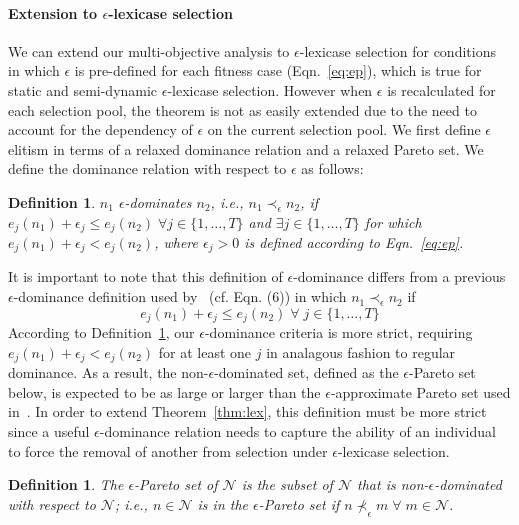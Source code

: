 \documentclass[twoside]{article}
\newtheorem{defn}[lex]{Definition}
\begin{document}
\paragraph{Extension to $\epsilon$-lexicase selection}
We can extend our multi-objective analysis to $\epsilon$-lexicase selection for conditions in which $\epsilon$ is pre-defined for each fitness case  (Eqn.~\ref{eq:ep}), which is true for static and semi-dynamic $\epsilon$-lexicase selection. However when $\epsilon$ is recalculated for each selection pool, the theorem is not as easily extended due to the need to account for the dependency of $\epsilon$ on the current selection pool. We first define $\epsilon$ elitism in terms of a relaxed dominance relation and a relaxed Pareto set. We define the dominance relation with respect to $\epsilon$ as follows:


\begin{defn}\label{def:edom}
$n_1$ {\it $\epsilon$-dominates} $n_2$, i.e., ${n_1} \prec_{\epsilon} {n_2}$, if $e_j(n_1) + \epsilon_j \leq e_j(n_2)  \;
\forall j  \in \{1,\dots,T\}$ and $\exists j \in \{1,\dots,T\}$ for which $e_j(n_1) + \epsilon_j < e_j(n_2) $, where $\epsilon_j>0$ is defined according to Eqn.~\ref{eq:ep}.
\end{defn}


It is important to note that this definition of $\epsilon$-dominance differs from a previous $\epsilon$-dominance definition used by~\cite{laumanns_archiving_2002} (cf. Eqn. (6)) in which ${n_1} \prec_{\epsilon} {n_2}$ if \[ e_j(n_1) + \epsilon_j \leq e_j(n_2) \; \forall \; j  \in \{1,\dots,T\}\] According to Definition~\ref{def:edom}, our $\epsilon$-dominance criteria is more strict, requiring $e_j(n_1) + \epsilon_j < e_j(n_2)$ for at least one $j$ in analagous fashion to regular dominance. As a result, the non-$\epsilon$-dominated set, defined as the $\epsilon$-Pareto set below, is expected to be as large or larger than the $\epsilon$-approximate Pareto set used in~\citep{laumanns_archiving_2002}. In order to extend Theorem~\ref{thm:lex}, this definition must be more strict since a useful $\epsilon$-dominance relation needs to capture the ability of an individual to force the removal of another from selection under $\epsilon$-lexicase selection. 
 
\begin{defn}\label{def:epset}
The {\it $\epsilon$-Pareto set} of $\mathcal{N}$ is the subset of $\mathcal{N}$ that is non-$\epsilon$-dominated with respect to $\mathcal{N}$; i.e., $n \in \mathcal{N}$ is in the $\epsilon$-Pareto set if $n \nprec_{\epsilon} m \; \forall \; m \in \mathcal{N}$. 
\end{defn}
\end{document}
